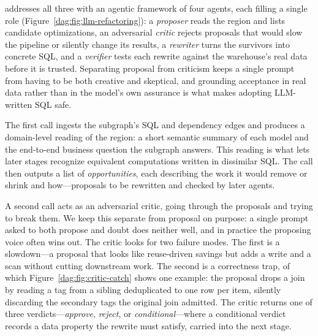 



\dagsmith{} addresses all three with an agentic framework of four agents, each filling a single role  (Figure~\ref{dag:fig:llm-refactoring}): a \emph{proposer} reads the region and lists candidate optimizations, an adversarial \emph{critic} rejects proposals that would slow the pipeline or silently change its results, a \emph{rewriter} turns the survivors into concrete SQL, and a \emph{verifier} tests each rewrite against the warehouse's real data before it is trusted. Separating proposal from criticism keeps a single prompt from having to be both creative and skeptical, and grounding acceptance in real data rather than in the model's own assurance is what makes adopting LLM-written SQL safe.



The first call ingests the subgraph's SQL and dependency edges and produces a domain-level reading of the region: a short semantic summary of each model and the end-to-end business question the subgraph answers. This reading is what lets later stages recognize equivalent computations written in dissimilar SQL. 
The call then outputs a list of \emph{opportunities}, each describing the work it would remove or shrink and how—proposals to be rewritten and checked by later agents.

 A second call acts as an adversarial critic, going through the proposals and trying to break them. We keep this separate from proposal on purpose: a single prompt asked to both propose and doubt does neither well, and in practice the proposing voice often wins out. The critic looks for two failure modes. The first is a slowdown—a proposal that looks like reuse-driven savings but adds a write and a scan without cutting downstream work. The second is a correctness trap, of which Figure~\ref{dag:fig:critic-catch} shows one example: the proposal drops a join by reading a tag from a sibling deduplicated to one row per item, silently discarding the secondary tags the original join admitted. The critic returns one of three verdicts—\emph{approve}, \emph{reject}, or \emph{conditional}—where a conditional verdict records a data property the rewrite must satisfy, carried into the next stage.

